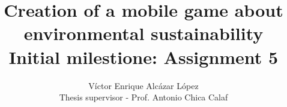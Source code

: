 

\title{Creation of a mobile game about environmental sustainability \\
 \large Initial milestione: Assignment 5}

\author{Víctor Enrique Alcázar López \\
	Thesis supervisor - Prof. Antonio Chica Calaf}


\maketitle
\tableofcontents










